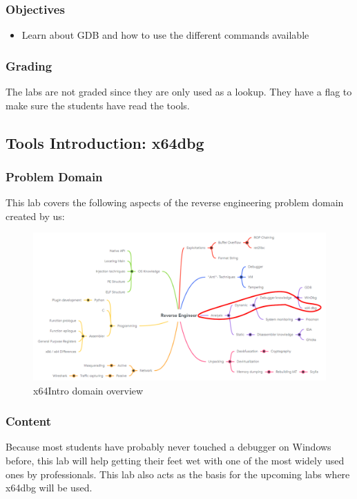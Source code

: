 \subsubsection*{Objectives}
\begin{itemize}
    \item Learn about GDB and how to use the different commands available
\end{itemize}
\subsubsection*{Grading}
The labs are not graded since they are only used as a lookup. They have a flag to make sure the students have read the tools.
\pagebreak

\subsection{Tools Introduction: x64dbg}
\subsubsection*{Problem Domain}
This lab covers the following aspects of the reverse engineering problem domain created by us:
\vspace{-2ex}
\begin{figure}[H]
    \includegraphics[width=\textwidth]{resources/x64Intro-overview-light.png}
    \caption{x64Intro domain overview}
    \label{fig:x64Intro-overview}
\end{figure}
\subsubsection*{Content}
Because most students have probably never touched a debugger on Windows before, this lab will help getting their feet wet with one of the most widely used ones by professionals.
This lab also acts as the basis for the upcoming labs where x64dbg will be used.
